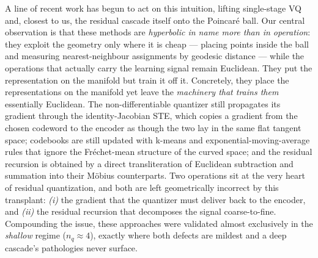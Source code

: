 \documentclass[12pt]{report}
\begin{document}
A line of recent work has begun to act on this intuition, lifting single-stage VQ \cite{hypervq, hvqvae} and, closest to us, the residual cascade itself \cite{hrqvae, hyprqvae_recsys} onto the Poincar\'e ball. Our central observation is that these methods are \emph{hyperbolic in name more than in operation}: they exploit the geometry only where it is cheap --- placing points inside the ball and measuring nearest-neighbour assignments by geodesic distance --- while the operations that actually carry the learning signal remain Euclidean. They put the representation on the manifold but train it off it. Concretely, they place the representations on the manifold yet leave the \emph{machinery that trains them} essentially Euclidean. The non-differentiable quantizer still propagates its gradient through the identity-Jacobian STE, which copies a gradient from the chosen codeword to the encoder as though the two lay in the same flat tangent space; codebooks are still updated with k-means and exponential-moving-average rules that ignore the Fr\'echet-mean structure of the curved space; and the residual recursion is obtained by a direct transliteration of Euclidean subtraction and summation into their M\"obius counterparts. Two operations sit at the very heart of residual quantization, and both are left geometrically incorrect by this transplant: \emph{(i)} the gradient that the quantizer must deliver back to the encoder, and \emph{(ii)} the residual recursion that decomposes the signal coarse-to-fine. Compounding the issue, these approaches were validated almost exclusively in the \emph{shallow} regime ($n_q\!\approx\!4$), exactly where both defects are mildest and a deep cascade's pathologies never surface.
\end{document}
